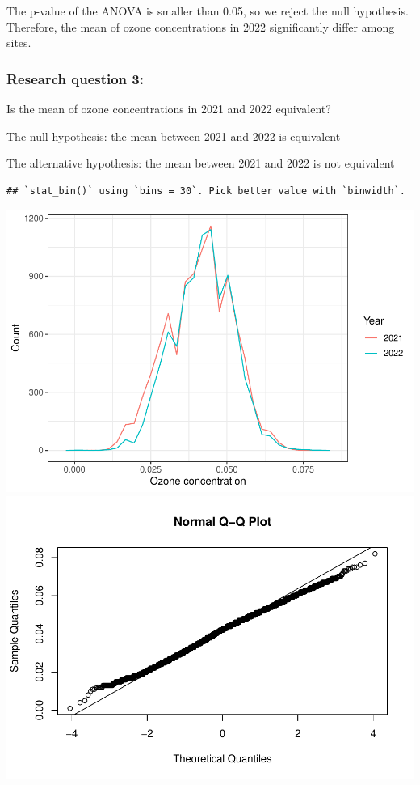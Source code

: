 \documentclass[
  12pt,
]{article}
\begin{document}
The p-value of the ANOVA is smaller than 0.05, so we reject the null
hypothesis. Therefore, the mean of ozone concentrations in 2022
significantly differ among sites.

\hypertarget{research-question-3}{%
\subsubsection{Research question 3:}\label{research-question-3}}

Is the mean of ozone concentrations in 2021 and 2022 equivalent?

The null hypothesis: the mean between 2021 and 2022 is equivalent

The alternative hypothesis: the mean between 2021 and 2022 is not
equivalent

\begin{verbatim}
## `stat_bin()` using `bins = 30`. Pick better value with `binwidth`.
\end{verbatim}

\includegraphics{Project_DataAnalysis_files/figure-latex/Q3 T-test-1.pdf}
\includegraphics{Project_DataAnalysis_files/figure-latex/Q3 T-test-2.pdf}
\end{document}
